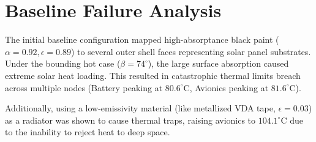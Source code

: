 \documentclass[11pt,a4paper]{article}
\begin{document}
\begin{table}[H]
\centering
\caption{Material Library and BOL Optical Properties}
\vspace{0.2cm}
\end{table}

\section{Baseline Failure Analysis}
The initial baseline configuration mapped high-absorptance black paint ($\alpha = 0.92, \epsilon = 0.89$) to several outer shell faces representing solar panel substrates. Under the bounding hot case ($\beta = 74^\circ$), the large surface absorption caused extreme solar heat loading. This resulted in catastrophic thermal limits breach across multiple nodes (Battery peaking at $80.6^\circ$C, Avionics peaking at $81.6^\circ$C). 

Additionally, using a low-emissivity material (like metallized VDA tape, $\epsilon = 0.03$) as a radiator was shown to cause thermal traps, raising avionics to $104.1^\circ$C due to the inability to reject heat to deep space.
\end{document}
